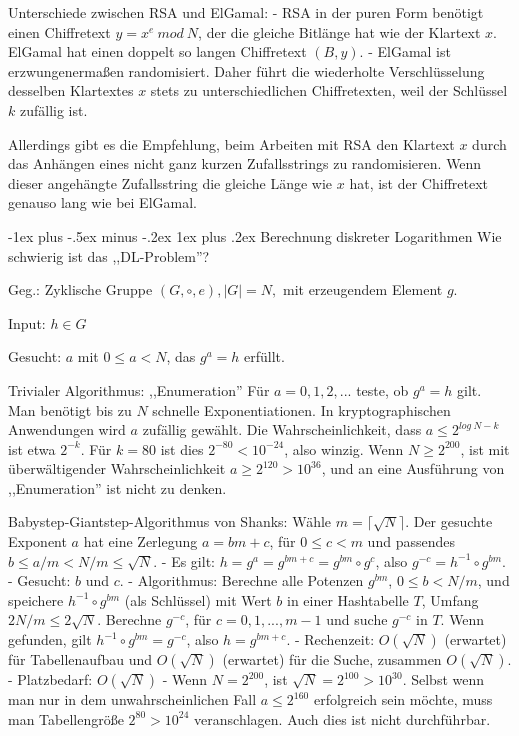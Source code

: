 \documentclass[a4paper]{article}
\makeatletter
\renewcommand{\subsubsection}{\@startsection{subsubsection}{3}{0mm}%
 {-1ex plus -.5ex minus -.2ex}%
 {1ex plus .2ex}%
 {\normalfont\small\bfseries}}
\makeatother
\begin{document}
\begin{multicols}{3}
        Unterschiede zwischen RSA und ElGamal:
        - RSA in der puren Form benötigt einen Chiffretext $y=x^e\ mod\ N$, der die gleiche Bitlänge hat wie der Klartext $x$. ElGamal hat einen doppelt so langen Chiffretext $(B,y)$.
        - ElGamal ist erzwungenermaßen randomisiert. Daher führt die wiederholte Verschlüsselung desselben Klartextes $x$ stets zu unterschiedlichen Chiffretexten, weil der Schlüssel $k$ zufällig ist.

        Allerdings gibt es die Empfehlung, beim Arbeiten mit RSA den Klartext $x$ durch das Anhängen eines nicht ganz kurzen Zufallsstrings zu
        randomisieren. Wenn dieser angehängte Zufallsstring die gleiche Länge wie $x$ hat, ist der Chiffretext genauso lang wie bei ElGamal.

        \subsubsection{Berechnung diskreter Logarithmen}
        Wie schwierig ist das ,,DL-Problem''?

        Geg.: Zyklische Gruppe $(G,\circ,e),|G|=N,$ mit erzeugendem Element $g$.

        Input: $h\in G$

        Gesucht: $a$ mit $0\leq a<N$, das $g^a=h$ erfüllt.

        Trivialer Algorithmus: ,,Enumeration''
        Für $a=0,1,2 ,...$ teste, ob $g^a=h$ gilt. Man benötigt bis zu $N$ schnelle Exponentiationen. In kryptographischen Anwendungen wird $a$ zufällig gewählt. Die Wahrscheinlichkeit, dass $a\leq 2^{log\ N-k}$ ist etwa $2^{-k}$. Für $k= 80$ ist dies $2^{-80}< 10^{-24}$, also winzig. Wenn $N\geq 2^{200}$, ist mit überwältigender Wahrscheinlichkeit $a\geq 2^{120}> 10^{36}$, und an eine Ausführung von ,,Enumeration'' ist nicht zu denken.

        Babystep-Giantstep-Algorithmus von Shanks:
        Wähle $m=\lceil \sqrt{N}\rceil$. Der gesuchte Exponent $a$ hat eine Zerlegung $a=bm+c$, für $0\leq c < m$ und passendes $b\leq a/m < N/m\leq \sqrt{N}$.
        - Es gilt: $h=g^a=g^{bm+c}=g^{bm} \circ g^c$, also $g^{-c}=h^{-1}\circ g^{bm}$.
        - Gesucht: $b$ und $c$.
        - Algorithmus: Berechne alle Potenzen $g^{bm}$, $0\leq b < N/m$, und speichere $h^{-1}\circ g^{bm}$ (als Schlüssel) mit Wert $b$ in einer Hashtabelle $T$, Umfang $2N/m\leq 2\sqrt{N}$. Berechne $g^{-c}$, für $c=0,1,...,m-1$ und suche $g^{-c}$ in $T$. Wenn gefunden, gilt $h^{-1} \circ g^{bm}=g^{-c}$, also $h=g^{bm+c}$.
        - Rechenzeit: $O(\sqrt{N})$ (erwartet) für Tabellenaufbau und $O(\sqrt{N})$ (erwartet) für die Suche, zusammen $O(\sqrt{N})$.
        - Platzbedarf: $O(\sqrt{N})$
        - Wenn $N=2^{200}$, ist $\sqrt{N}= 2^{100}> 10^{30}$. Selbst wenn man nur in dem unwahrscheinlichen Fall $a\leq 2^{160}$ erfolgreich sein möchte, muss man Tabellengröße $2^{80}> 10^{24}$ veranschlagen. Auch dies ist nicht durchführbar.


\end{multicols}
\end{document}
